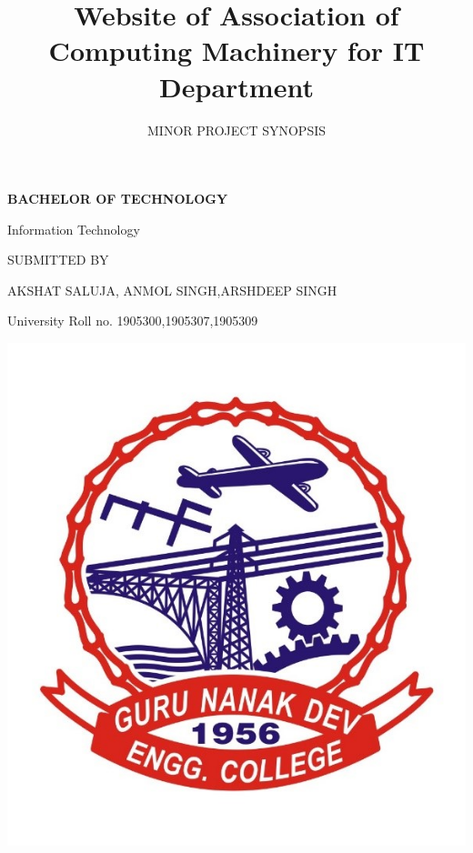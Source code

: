 \documentclass[english]{article}
\begin{document}
\title{Website of Association of Computing Machinery for IT Department }
\author{MINOR PROJECT SYNOPSIS }
\maketitle
\begin{center}
\textbf{BACHELOR OF TECHNOLOGY }
\par\end{center}

\begin{doublespace}
\begin{center}
Information Technology
\par\end{center}
\end{doublespace}

\begin{center}
SUBMITTED BY
\par\end{center}

\begin{center}
AKSHAT SALUJA, ANMOL SINGH,ARSHDEEP SINGH
\par\end{center}

\begin{center}
University Roll no. 1905300,1905307,1905309
\par\end{center}

\begin{center}
\includegraphics[scale=0.2]{./logo_college.jpg}
\par\end{center}
\end{document}
